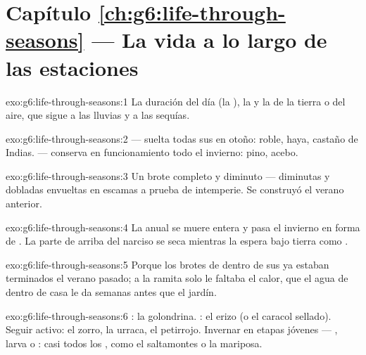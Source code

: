 \section*{Capítulo \ref{ch:g6:life-through-seasons} --- La vida a lo largo de las estaciones}

\begin{solution}{exo:g6:life-through-seasons:1}
La duración del día (la ), la  y la  de la tierra
o del aire, que sigue a las lluvias y a las sequías.
\end{solution}

\begin{solution}{exo:g6:life-through-seasons:2}
 --- suelta todas sus  en otoño: roble, haya, castaño
de Indias.  --- conserva  en funcionamiento todo el
invierno: pino, acebo.
\end{solution}

\begin{solution}{exo:g6:life-through-seasons:3}
Un brote completo y diminuto ---  diminutas y dobladas envueltas
en escamas a prueba de intemperie. Se construyó el verano anterior.
\end{solution}

\begin{solution}{exo:g6:life-through-seasons:4}
La anual se muere entera y pasa el invierno en forma de . La
parte de arriba del narciso se seca mientras la  espera bajo
tierra como .
\end{solution}

\begin{solution}{exo:g6:life-through-seasons:5}
Porque los brotes de dentro de sus  ya estaban terminados el
verano pasado; a la ramita solo le faltaba el calor, que el agua de
dentro de casa le da semanas antes que el jardín.
\end{solution}

\begin{solution}{exo:g6:life-through-seasons:6}
: la golondrina. : el erizo (o el caracol sellado).
Seguir activo: el zorro, la urraca, el petirrojo. Invernar en etapas
jóvenes --- , larva o : casi todos los , como el
saltamontes o la mariposa.
\end{solution}

